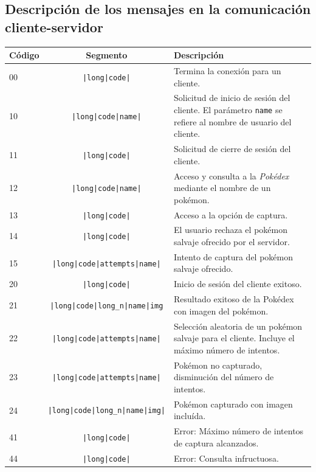 \documentclass[12pt]{article}
\begin{document}
\subsection{Descripción de los mensajes en la comunicación cliente-servidor}
\begin{center}
  \begin{tabular}{|l|c|p{5.9cm}|}
    \hline
    Código & Segmento & Descripción \\ \hline
    \hline
    00 & \texttt{|long|code|} & Termina la conexión para un cliente. \\ \hline
    10 & \texttt{|long|code|name|} & Solicitud de inicio de sesión del cliente. El parámetro \texttt{name} se refiere al nombre de usuario del cliente. \\ \hline
    11 & \texttt{|long|code|} & Solicitud de cierre de sesión del cliente. \\ \hline
    12 & \texttt{|long|code|name|} & Acceso y consulta a la \textit{Pokédex} mediante el nombre de un pokémon. \\ \hline
    13 & \texttt{|long|code|} & Acceso a la opción de captura. \\ \hline
    14 & \texttt{|long|code|} & El usuario rechaza el pokémon salvaje ofrecido por el servidor. \\ \hline
    15 & \texttt{|long|code|attempts|name|} & Intento de captura del pokémon salvaje ofrecido. \\ \hline %
    \hline
    20 & \texttt{|long|code|} & Inicio de sesión del cliente exitoso. \\ \hline
    21 & \texttt{|long|code|long\_n|name|img} & Resultado exitoso de la Pokédex con imagen del pokémon. \\ \hline %
    22 & \texttt{|long|code|attempts|name|} & Selección aleatoria de un pokémon salvaje para el cliente. Incluye el máximo número de intentos. \\ \hline
    23 & \texttt{|long|code|attempts|name|} & Pokémon no capturado, disminución del número de intentos. \\ \hline
    24 & \texttt{|long|code|long\_n|name|img|} & Pokémon capturado con imagen incluída. \\ \hline \hline
    41 & \texttt{|long|code|} & Error: Máximo número de intentos de captura alcanzados. \\ \hline
    44 & \texttt{|long|code|} & Error: Consulta infructuosa. \\ \hline
  \end{tabular}
\end{center}
\end{document}
